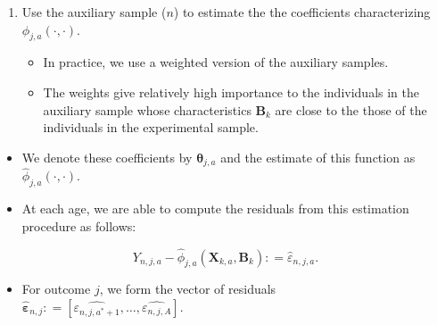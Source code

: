 \documentclass[static]{JJH-Beamer}
\begin{document}
\begin{frame}

\begin{enumerate}[1.]
\item Use the auxiliary sample ($n$) to estimate the the coefficients characterizing $\phi_{j,a} \left( \cdot , \cdot \right)$.
    \begin{itemize}
    \item In practice, we use a weighted version of the auxiliary samples.
    \item The weights give relatively high importance to the individuals in the auxiliary sample whose characteristics $\bm{B}_k$ are close to the those of the individuals in the experimental sample.
    \end{itemize}
\end{enumerate}

\end{frame}

\begin{frame}

\begin{itemize}
\item We denote these coefficients by $\bm{\theta}_{j,a}$ and the estimate of this function as $\hat{\phi}_{j,a} \left( \cdot , \cdot \right)$.
\item At each age, we are able to compute the residuals from this estimation procedure as follows:
\end{itemize}
\end{frame}

\begin{frame}

\begin{equation}
Y_{n,j,a} -  \hat{\phi}_{j,a} (\bm{X}_{k,a}, \bm{B}_k) : = \hat{\varepsilon}_{n,j,a}.
\end{equation}

\begin{itemize}
\item For outcome $j$, we form the vector of residuals \\ $\hat{\bm{\varepsilon}}_{n,j} : = \left[ \hat{\varepsilon_{n,j,a^*+1}}, \ldots, \hat{\varepsilon_{n,j,A}} \right]$.
\end{itemize}

\end{frame}
\end{document}
